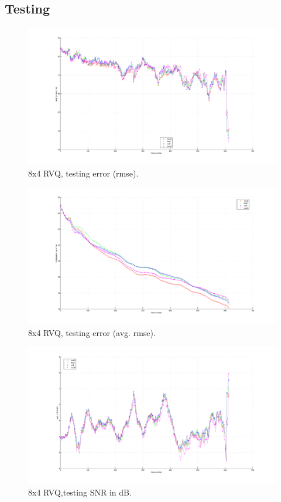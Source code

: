 \subsection{Testing}
								\begin{figure}[h!]
								\centering
								\includegraphics[height=0.4\textheight]{thesis/3_sylv_8_4_1000_tst_rmse.pdf}
								\caption{8x4 RVQ, testing error (rmse).}
								\label{fig:3_sylv_8_4_1000_tst_rmse}
								\end{figure}


								\begin{figure}[h!]
								\centering
								\includegraphics[height=0.4\textheight]{thesis/3_sylv_8_4_1000_tst_armse.pdf}
								\caption{8x4 RVQ, testing error (avg. rmse).}
								\label{fig:3_sylv_8_4_1000_tst_armse}
								\end{figure}

								\begin{figure}[h!]
								\centering
								\includegraphics[height=0.4\textheight]{thesis/3_sylv_8_4_1000_tst_SNRdB.pdf}
								\caption{8x4 RVQ,testing SNR in dB.}
								\label{fig:3_sylv_8_4_1000_tst_SNRdB}
								\end{figure}
